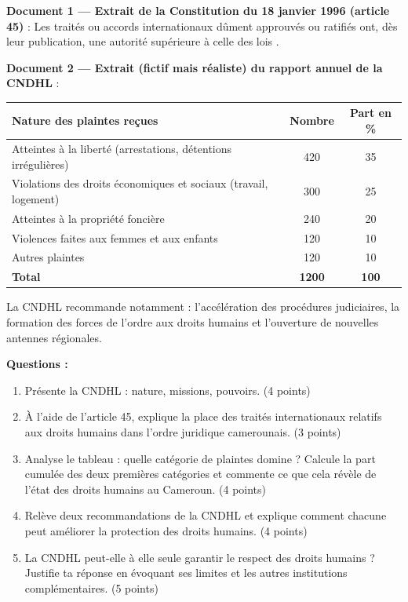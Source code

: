 \documentclass[11pt]{article}
\begin{document}
\begin{exercice}
\textbf{Document 1 — Extrait de la Constitution du 18 janvier 1996 (article 45)} : \og Les traités ou accords internationaux dûment approuvés ou ratifiés ont, dès leur publication, une autorité supérieure à celle des lois \fg.

\textbf{Document 2 — Extrait (fictif mais réaliste) du rapport annuel de la CNDHL} :

\begin{center}
\begin{tabularx}{\linewidth}{|X|c|c|}
\hline
\rowcolor{popblueL} \textbf{Nature des plaintes reçues} & \textbf{Nombre} & \textbf{Part en \%} \\
\hline
Atteintes à la liberté (arrestations, détentions irrégulières) & 420 & 35 \\
\hline
Violations des droits économiques et sociaux (travail, logement) & 300 & 25 \\
\hline
Atteintes à la propriété foncière & 240 & 20 \\
\hline
Violences faites aux femmes et aux enfants & 120 & 10 \\
\hline
Autres plaintes & 120 & 10 \\
\hline
\textbf{Total} & \textbf{1200} & \textbf{100} \\
\hline
\end{tabularx}
\end{center}

La CNDHL recommande notamment : l'accélération des procédures judiciaires, la formation des forces de l'ordre aux droits humains et l'ouverture de nouvelles antennes régionales.

\textbf{Questions :}
\begin{enumerate}
\item Présente la CNDHL : nature, missions, pouvoirs. (4 points)
\item À l'aide de l'article 45, explique la place des traités internationaux relatifs aux droits humains dans l'ordre juridique camerounais. (3 points)
\item Analyse le tableau : quelle catégorie de plaintes domine ? Calcule la part cumulée des deux premières catégories et commente ce que cela révèle de l'état des droits humains au Cameroun. (4 points)
\item Relève deux recommandations de la CNDHL et explique comment chacune peut améliorer la protection des droits humains. (4 points)
\item La CNDHL peut-elle à elle seule garantir le respect des droits humains ? Justifie ta réponse en évoquant ses limites et les autres institutions complémentaires. (5 points)
\end{enumerate}
\end{exercice}
\end{document}
